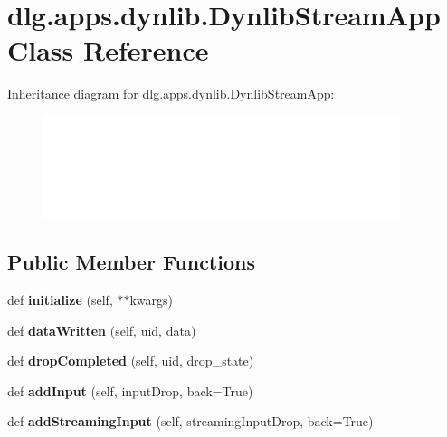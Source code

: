 \hypertarget{classdlg_1_1apps_1_1dynlib_1_1_dynlib_stream_app}{}\section{dlg.\+apps.\+dynlib.\+Dynlib\+Stream\+App Class Reference}
\label{classdlg_1_1apps_1_1dynlib_1_1_dynlib_stream_app}
Inheritance diagram for dlg.\+apps.\+dynlib.\+Dynlib\+Stream\+App\+:\begin{figure}[H]
\begin{center}
\leavevmode
\includegraphics[height=3.000000cm]{classdlg_1_1apps_1_1dynlib_1_1_dynlib_stream_app}
\end{center}
\end{figure}
\subsection*{Public Member Functions}
\begin{DoxyCompactItemize}
\item 
\mbox{\label{classdlg_1_1apps_1_1dynlib_1_1_dynlib_stream_app_a6dd6d0b2c4691304f757c9f7a21c4b54}} 
def {\bfseries initialize} (self, $\ast$$\ast$kwargs)
\item 
\mbox{\label{classdlg_1_1apps_1_1dynlib_1_1_dynlib_stream_app_a0a2a8a0a67e2aa481935a2aa7594a966}} 
def {\bfseries data\+Written} (self, uid, data)
\item 
\mbox{\label{classdlg_1_1apps_1_1dynlib_1_1_dynlib_stream_app_abac879ff823ddb2078a8664bc9a6b74c}} 
def {\bfseries drop\+Completed} (self, uid, drop\+\_\+state)
\item 
\mbox{\label{classdlg_1_1apps_1_1dynlib_1_1_dynlib_stream_app_a7a863563ca814a9fd2356cfa31709799}} 
def {\bfseries add\+Input} (self, input\+Drop, back=True)
\item 
\mbox{\label{classdlg_1_1apps_1_1dynlib_1_1_dynlib_stream_app_a30997c756bd871d7994b5814b915ab1e}} 
def {\bfseries add\+Streaming\+Input} (self, streaming\+Input\+Drop, back=True)
\end{DoxyCompactItemize}
